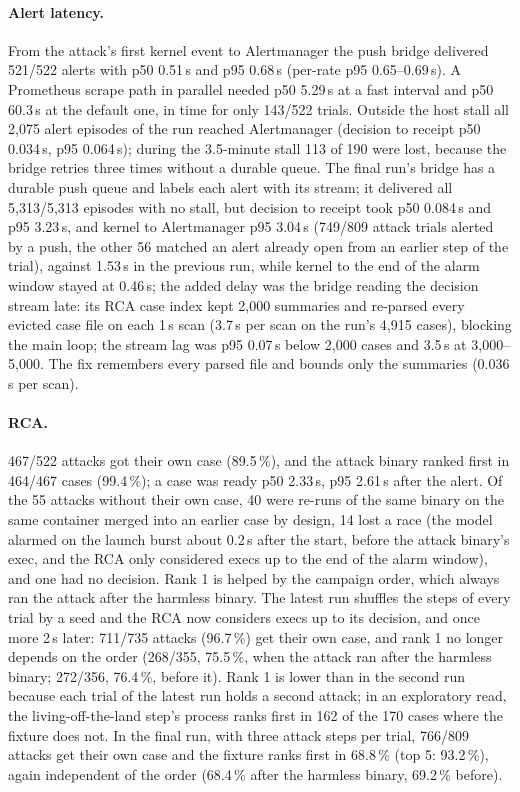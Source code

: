 \paragraph{Alert latency.}\label{sec:eval-alert} From the attack's first kernel event to Alertmanager the push bridge
delivered 521/522 alerts with p50 0.51\,s and p95 0.68\,s (per-rate p95 0.65--0.69\,s). A Prometheus scrape path in
parallel needed p50 5.29\,s at a fast interval and p50 60.3\,s at the default one, in time for only 143/522 trials.
Outside the host stall all 2{,}075 alert episodes of the run reached Alertmanager (decision to receipt p50 0.034\,s,
p95 0.064\,s); during the 3.5-minute stall 113 of 190 were lost, because the bridge retries three times without a
durable queue. The final run's bridge has a durable push queue and labels each alert with its stream; it delivered all
5{,}313/5{,}313 episodes with no stall, but decision to receipt took p50 0.084\,s and p95 3.23\,s, and kernel to
Alertmanager p95 3.04\,s (749/809 attack trials alerted by a push, the other 56 matched an alert already open from an
earlier step of the trial), against 1.53\,s in the previous run, while kernel to the end of the alarm window stayed at
0.46\,s; the added delay was the bridge reading the decision stream late: its RCA case index kept 2{,}000 summaries and re-parsed every evicted case file on each 1\,s scan (3.7\,s per scan on the run's 4{,}915 cases), blocking the main loop; the stream lag was p95 0.07\,s below 2{,}000 cases and 3.5\,s at 3{,}000--5{,}000. The fix remembers every parsed file and bounds only the summaries (0.036\,s per scan).

\paragraph{RCA.} 467/522 attacks got their own case (89.5\,\%), and the attack binary ranked first in 464/467 cases
(99.4\,\%); a case was ready p50 2.33\,s, p95 2.61\,s after the alert. Of the 55 attacks without their own case, 40
were re-runs of the same binary on the same container merged into an earlier case by design, 14 lost a race (the model
alarmed on the launch burst about 0.2\,s after the start, before the attack binary's exec, and the RCA only considered
execs up to the end of the alarm window), and one had no decision. Rank 1 is helped by the campaign order, which always
ran the attack after the harmless binary. The latest run shuffles the steps of every trial by a seed and the RCA now
considers execs up to its decision, and once more 2\,s later: 711/735 attacks (96.7\,\%) get their own case, and rank 1
no longer depends on the order (268/355, 75.5\,\%, when the attack ran after the harmless binary; 272/356, 76.4\,\%,
before it). Rank 1 is lower than in the second run because each trial of the latest run holds a second attack; in an
exploratory read, the living-off-the-land step's process ranks first in 162 of the 170 cases where the fixture does not.
In the final run, with three attack steps per trial, 766/809 attacks get their own case and the fixture ranks first in
68.8\,\% (top 5: 93.2\,\%), again independent of the order (68.4\,\% after the harmless binary, 69.2\,\% before).

